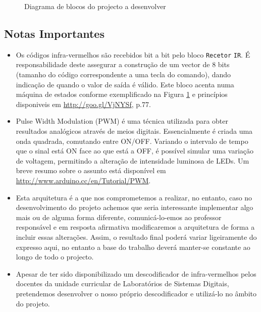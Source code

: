 \documentclass[a4paper,11pt,openright,oneside]{report}
\begin{document}
\begin{figure}[ht]
\center
{}
\caption{Diagrama de blocos do projecto a desenvolver}
\label{fig:ir_leds2}
\end{figure}

\subsection{Notas Importantes}

\begin{itemize}
\item Os códigos infra-vermelhos são recebidos bit a bit pelo bloco \verb|Recetor| \verb|IR|. É responsabilidade deste assegurar a construção de um vector de 8 bits (tamanho do código correspondente a uma tecla do comando), dando indicação de quando o valor de saída é válido. Este bloco acenta numa máquina de estados conforme exemplificado na Figura \ref{fig:ir_leds2} e princípios disponiveis em \url{http://goo.gl/VjNYSf}, p.77.
\item Pulse Width Modulation (PWM) é uma técnica utilizada para obter resultados analógicos através de meios digitais. Essencialmente é criada uma onda quadrada, comutando entre ON/OFF. Variando o intervalo de tempo que o sinal está ON face ao que está a OFF, é possível simular uma variação de voltagem, permitindo a alteração de intensidade luminosa de LEDs. Um breve resumo sobre o assunto está disponível em \url{http://www.arduino.cc/en/Tutorial/PWM}.
\item Esta arquitetura é a que nos comprometemos a realizar, no entanto, caso no desenvolvimento do projeto achemos que seria interessante implementar algo mais ou de alguma forma diferente, comunicá-lo-emos ao professor responsável e em resposta afirmativa modificaremos a arquitetura de forma a incluir essas alterações. Assim, o resultado final poderá variar ligeiramente do expresso aqui, no entanto a base do trabalho deverá manter-se constante ao longo de todo o projecto.
\item Apesar de ter sido disponibilizado um descodificador de infra-vermelhos pelos docentes da unidade curricular de Laboratórios de Sistemas Digitais, pretendemos desenvolver o nosso próprio descodificador e utilizá-lo no âmbito do projeto.
\end{itemize}
\end{document}
